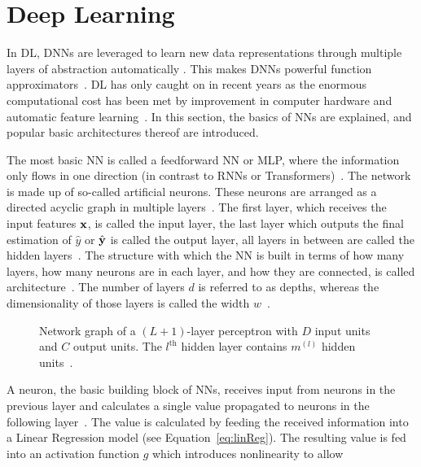 \section{Deep Learning}
In \ac{DL}, \acp{DNN} are leveraged to learn new data representations through
multiple layers of abstraction automatically .
This makes \acp{DNN} powerful function approximators~\citep{goodfellow_deep_2016}.
\ac{DL} has only caught on in recent years as the enormous computational cost has been met
by improvement in computer hardware and automatic feature
learning~\citep{ponti_everything_2017, chen_text_2021}.
In this section, the basics of \acp{NN} are explained, and popular basic architectures thereof are
introduced.

The most basic \ac{NN} is called a feedforward \ac{NN} or \ac{MLP}, where the information only
flows in one direction (in contrast to \acp{RNN} or Transformers)~\citep{goodfellow_deep_2016}.
The network is made up of so-called artificial neurons.
These neurons are arranged as a directed acyclic graph in multiple
layers~\citep{goodfellow_deep_2016}.
The first layer, which receives the input features $\textbf{x}$, is called the input layer, the last layer
which outputs the final estimation of $\hat{y}$ or $\hat{\textbf{y}}$ is called the output layer, all layers in between
are called the hidden layers~\citep{shrestha_review_2019}.
The structure with which the \ac{NN} is built in terms of how many layers, how many neurons are in
each layer, and how they are connected, is called architecture~\citep{goodfellow_deep_2016}.
The number of layers $d$ is referred to as depths, whereas the dimensionality of those layers is
called the width $w$~\citep{goodfellow_deep_2016}.
\begin{figure}[ht]
	\centering
    
	\caption[Network graph for a MLP]{%
        Network graph of a $(L+1)$-layer perceptron with $D$ input units and $C$ output units.
        The $l^{\text{th}}$ hidden layer contains $m^{(l)}$ hidden
        units~\citep{chauhan_review_2018,goodfellow_deep_2016}.\label{fig:multilayer-perceptron}
    }
\end{figure}
A neuron, the basic building block of \acp{NN}, receives input from neurons in the previous layer
and calculates a single value propagated to neurons in the following
layer~\citep{shrestha_review_2019}.
The value is calculated by feeding the received information into a Linear Regression model (see
Equation~\ref{eq:linReg}).
The resulting value is fed into an activation function $g$ which introduces nonlinearity to allow
